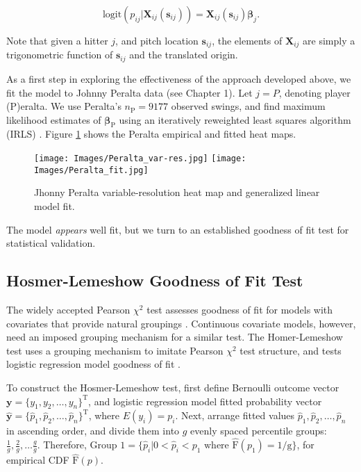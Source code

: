 \begin{equation}
\text{logit}(p_{ij}|\pmb{X}_{ij}(\pmb{s}_{ij})) = \pmb{X}_{ij}(\pmb{s}_{ij}) \pmb{\beta}_{j}.
\end{equation}


Note that given a hitter $j$, and pitch location $\pmb{s}_{ij}$, the elements of $\pmb{X}_{ij}$ are simply a trigonometric function of $\pmb{s}_{ij}$ and the translated origin.

As a first step in exploring the effectiveness of the approach developed above, we fit the model to Johnny Peralta data (see Chapter 1). Let $j = P$, denoting player (P)eralta. We use Peralta's $n_{\text{P}} = 9177$ observed swings, and find maximum likelihood estimates of $\pmb{\beta}_{\text{P}}$ using an iteratively reweighted least squares algorithm (IRLS) \citep{Myers2012}. Figure \ref{fig:empvsfit} shows the Peralta empirical and fitted heat maps.
  \begin{figure}[!ht]
    \centering
    \texttt{[image: Images/Peralta\_var-res.jpg]}
    \texttt{[image: Images/Peralta\_fit.jpg]}
    \caption{Jhonny Peralta variable-resolution heat map and generalized linear model fit.}
    \label{fig:empvsfit}
  \end{figure}
The model {\it appears} well fit, but we turn to an established goodness of fit test for statistical validation.

\subsection{Hosmer-Lemeshow Goodness of Fit Test} %

The widely accepted Pearson $\chi^{2}$ test assesses goodness of fit for models with covariates that provide natural groupings \citep{Pagano2000}. Continuous covariate models, however, need an imposed grouping mechanism for a similar test. The Homer-Lemeshow test uses a grouping mechanism to imitate Pearson $\chi^{2}$ test structure, and tests logistic regression model goodness of fit \citep{Hosmer2013}. 

To construct the Hosmer-Lemeshow test, first define Bernoulli outcome vector $\pmb{y} = \{y_{1}, y_{2}, \dots, y_{n}\}^{\text{T}}$, and logistic regression model fitted probability vector $\hat{\pmb{y}} = \{\hat{p}_{1}, \hat{p}_{2}, \dots, \hat{p}_{n}\}^{\text{T}}$, where $E(y_{i}) = p_{i}$. Next, arrange fitted values $\hat{p}_{1}, \hat{p}_{2}, \dots, \hat{p}_{n}$ in ascending order, and divide them into $g$ evenly spaced percentile groups: $\frac{1}{g}, \frac{2}{g}, \dots \frac{g}{g}$. Therefore, $\text{Group 1} = \{\hat{p}_{i}|0 < \hat{p}_{i} < p_{1} \text{ where } \hat{\text{F}}(p_{1})=1/\text{g} \}$, for empirical CDF $\hat{\text{F}}(p)$. 


